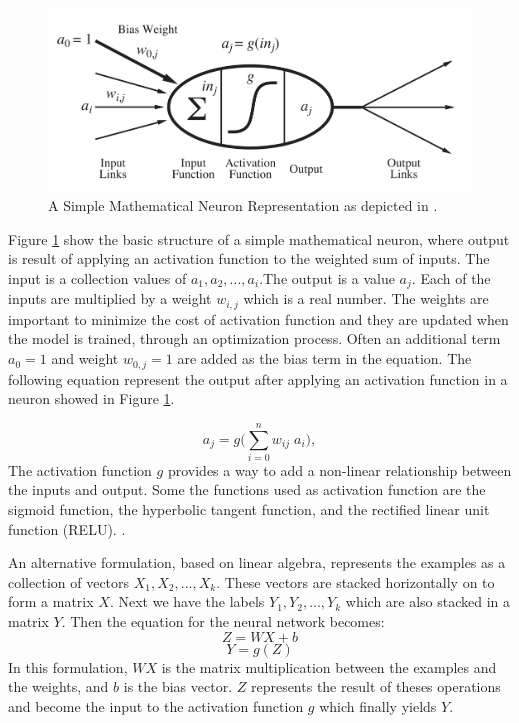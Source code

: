 \documentclass[12pt]{report}
\begin{document}
	\begin{figure}[H]	
		\centering
		\includegraphics[width=160mm, scale = 1]{images/3_neuron.png}	
		\caption{A Simple Mathematical Neuron Representation as depicted in \cite{Russell2010}.}	
		\label{figure:Mathematical_Neuron}
	\end{figure}
	
	Figure \ref{figure:Mathematical_Neuron} show the basic structure of a simple mathematical neuron, where output is result of applying an activation function to the weighted sum of inputs. The input is a collection values of $a_1, a_2, ..., a_i$.The output is a value $a_j$. Each of the inputs are multiplied by a weight $w_{i,j}$ which is a real number. The weights are important to minimize the cost of activation function and they are updated when the model is trained, through an optimization process. Often an additional term $a_0=1$ and weight $w_{0,j}=1$ are added as the bias term in the equation. The following equation represent the output after applying an activation function in a neuron showed in Figure \ref{figure:Mathematical_Neuron}.
	
	\begin{equation}
	a_j=g\Biggl(\sum_{i=0}^{n} w_{ij}\; a_i\Biggr),
	\end{equation}
	The activation function $g$ provides a way to add a non-linear relationship between the inputs and output. Some the functions used as activation function are the sigmoid function, the hyperbolic tangent function, and the rectified linear unit function (RELU). \cite{Goodfellow2016}. 
	
	An alternative formulation, based on linear algebra, represents the examples as a collection of vectors $X_1, X_2, ..., X_k$. These vectors 
	are stacked horizontally on to form a matrix $X$. Next we have the labels $Y_1, Y_2, ..., Y_k$ which are also stacked in a matrix $Y$. 
	Then the equation for the neural network becomes: 
	\[
	Z = WX + b
	\]
	\[
	Y = g(Z)
	\]
	In this formulation, $WX$ is the matrix multiplication between the examples and the weights, and $b$ is the bias vector. $Z$ represents the 
	result of theses operations and become the input to the activation function $g$ which finally yields $Y$.
	
\end{document}
